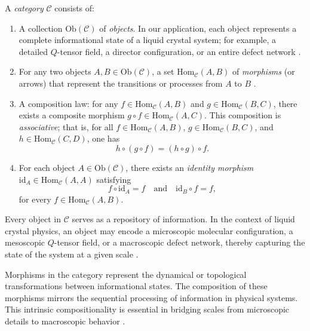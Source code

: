 \begin{definition}[Category]
	A \emph{category} \(\mathcal{C}\) consists of:
	\begin{enumerate}[label=(\roman*)]
		\item A collection \(\mathrm{Ob}(\mathcal{C})\) of \emph{objects}. In our application, each object represents a complete informational state of a liquid crystal system; for example, a detailed \(Q\)-tensor field, a director configuration, or an entire defect network \cite{maclane1971categories}.
		\item For any two objects \(A,B \in \mathrm{Ob}(\mathcal{C})\), a set \(\mathrm{Hom}_{\mathcal{C}}(A,B)\) of \emph{morphisms} (or arrows) that represent the transitions or processes from \(A\) to \(B\) \cite{maclane1971categories}.
		\item A composition law: for any \(f \in \mathrm{Hom}_{\mathcal{C}}(A,B)\) and \(g \in \mathrm{Hom}_{\mathcal{C}}(B,C)\), there exists a composite morphism \(g\circ f \in \mathrm{Hom}_{\mathcal{C}}(A,C)\). This composition is \emph{associative}; that is, for all \(f \in \mathrm{Hom}_{\mathcal{C}}(A,B)\), \(g \in \mathrm{Hom}_{\mathcal{C}}(B,C)\), and \(h \in \mathrm{Hom}_{\mathcal{C}}(C,D)\), one has
		\[
		h\circ (g\circ f) = (h\circ g)\circ f.
		\]
		\item For each object \(A \in \mathrm{Ob}(\mathcal{C})\), there exists an \emph{identity morphism} \(\mathrm{id}_A \in \mathrm{Hom}_{\mathcal{C}}(A,A)\) satisfying
		\[
		f\circ \mathrm{id}_A = f \quad \text{and} \quad \mathrm{id}_B\circ f = f,
		\]
		for every \(f \in \mathrm{Hom}_{\mathcal{C}}(A,B)\).
	\end{enumerate}
\end{definition}

\begin{axiom}
	Every object in \(\mathcal{C}\) serves as a repository of information. In the context of liquid crystal physics, an object may encode a microscopic molecular configuration, a mesoscopic \(Q\)-tensor field, or a macroscopic defect network, thereby capturing the state of the system at a given scale \cite{spivak2014category, degennes1993physics}.
\end{axiom}

\begin{remark}
	Morphisms in the category represent the dynamical or topological transformations between informational states. The composition of these morphisms mirrors the sequential processing of information in physical systems. This intrinsic compositionality is essential in bridging scales from microscopic details to macroscopic behavior \cite{spivak2014category}.
\end{remark}

